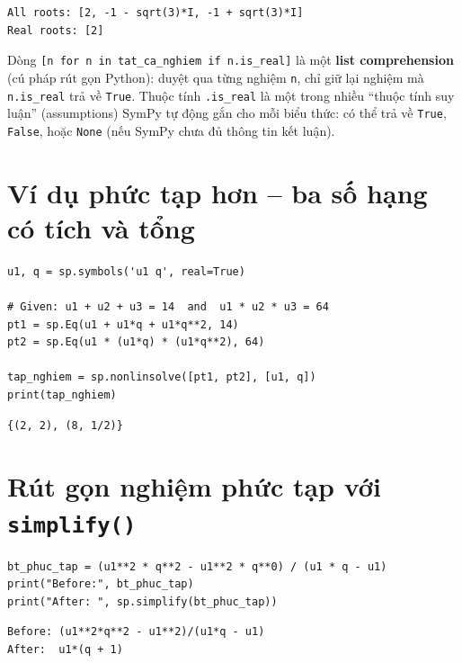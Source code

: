 \documentclass[12pt,a4paper]{report}
\begin{document}
\begin{lstlisting}[style=outstyle,caption={Kết quả}]
All roots: [2, -1 - sqrt(3)*I, -1 + sqrt(3)*I]
Real roots: [2]
\end{lstlisting}

\begin{infobox}
Dòng \texttt{[n for n in tat\_ca\_nghiem if n.is\_real]} là một
\textbf{list comprehension} (cú pháp rút gọn Python): duyệt qua từng
nghiệm \texttt{n}, chỉ giữ lại nghiệm mà \texttt{n.is\_real} trả về
\texttt{True}. Thuộc tính \texttt{.is\_real} là một trong nhiều
``thuộc tính suy luận'' (assumptions) SymPy tự động gắn cho mỗi biểu
thức: có thể trả về \texttt{True}, \texttt{False}, hoặc \texttt{None}
(nếu SymPy chưa đủ thông tin kết luận).
\end{infobox}

\section{Ví dụ phức tạp hơn -- ba số hạng có tích và tổng}

\begin{lstlisting}[caption={Bài toán: tổng và tích ba số hạng liên tiếp}]
u1, q = sp.symbols('u1 q', real=True)

# Given: u1 + u2 + u3 = 14  and  u1 * u2 * u3 = 64
pt1 = sp.Eq(u1 + u1*q + u1*q**2, 14)
pt2 = sp.Eq(u1 * (u1*q) * (u1*q**2), 64)

tap_nghiem = sp.nonlinsolve([pt1, pt2], [u1, q])
print(tap_nghiem)
\end{lstlisting}

\begin{lstlisting}[style=outstyle,caption={Kết quả (rút gọn)}]
{(2, 2), (8, 1/2)}
\end{lstlisting}

\section{Rút gọn nghiệm phức tạp với \texttt{simplify()}}

\begin{lstlisting}[caption={Rút gọn biểu thức nghiệm}]
bt_phuc_tap = (u1**2 * q**2 - u1**2 * q**0) / (u1 * q - u1)
print("Before:", bt_phuc_tap)
print("After: ", sp.simplify(bt_phuc_tap))
\end{lstlisting}

\begin{lstlisting}[style=outstyle,caption={Kết quả}]
Before: (u1**2*q**2 - u1**2)/(u1*q - u1)
After:  u1*(q + 1)
\end{lstlisting}
\end{document}
